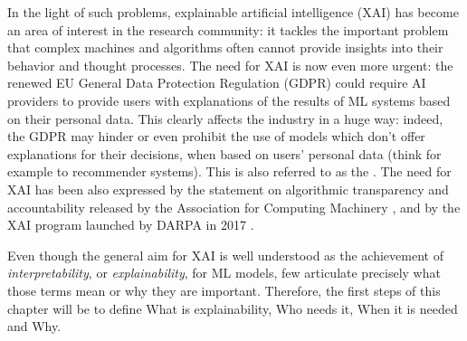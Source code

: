 In the light of such problems, explainable artificial intelligence (XAI) has become an area of interest in the research community: it tackles the important problem that complex machines and algorithms often cannot provide insights into their behavior and thought processes. The need for XAI is now even more urgent: the renewed EU General Data Protection Regulation (GDPR) could require AI providers to provide users with explanations of the results of ML systems based on their personal data. This clearly affects the industry in a huge way: indeed, the GDPR may hinder or even prohibit the use of  models which don't offer explanations for their decisions, when based on users' personal data (think for example to recommender systems). This is also referred to as the . The need for XAI has been also expressed by the statement on algorithmic transparency and accountability released by the Association for Computing Machinery \cite{acm2017transparency}, and by the XAI program launched by DARPA in 2017 \cite{gunning2019xai}.

Even though the general aim for XAI is well understood as the achievement of \textit{interpretability}, or \textit{explainability}, for ML models, few articulate precisely what those terms mean or why they are important. Therefore, the first steps of this chapter will be to define What is explainability, Who needs it, When it is needed and Why.

